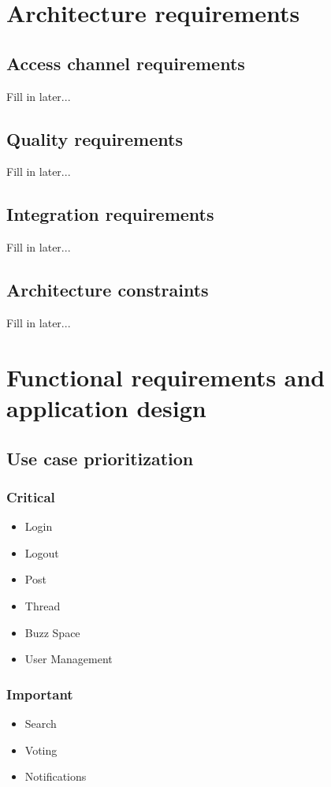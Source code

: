\documentclass[12pt, oneside]{article}
\begin{document}
\section{Architecture requirements}
	\subsection{Access channel requirements}
		Fill in later...
	\subsection{Quality requirements}
		Fill in later...
	\subsection{Integration requirements}
		Fill in later...
	\subsection{Architecture constraints}
		Fill in later...
	
\section{Functional requirements and application design}
	\subsection{Use case prioritization}
		\subsubsection{Critical}
			\begin{itemize}
				\item Login
				\item Logout
				\item Post
				\item Thread
				\item Buzz Space
				\item User Management
			 \end{itemize}
		\subsubsection{Important}
			\begin{itemize}
				\item Search
				\item Voting
				\item Notifications
			 \end{itemize}
\end{document}
